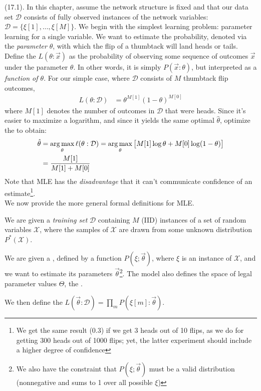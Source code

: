 \documentclass[11pt]{article}
\begin{document}
\p {} (17.1). In this chapter, assume the network structure is fixed and that our data set $\mathcal D$ consists of fully observed instances of the network variables: $\mathcal D = \{ \xi[1], \ldots, \xi[M] \}$. We begin with the simplest learning problem: parameter learning for a single variable. We want to estimate the probability, denoted via the \textit{parameter} $\theta$, with which the flip of a thumbtack will land heads or tails. Define the  $L(\theta : \vec{x})$ as the probability of observing some sequence of outcomes $\vec{x}$ under the parameter $\theta$. In other words, it is simply $P(\vec x : \theta)$, but interpreted as a \textit{function of $\theta$}. For our simple case, where $\mathcal D$ consists of $M$ thumbtack flip outcomes,
\begin{align}
	L(\theta : \mathcal D) &= \theta^{M[1]} (1 - \theta)^{M[0]}
\end{align}
where $M[1]$ denotes the number of outcomes in $\mathcal D$ that were heads. Since it's easier to maximize a logarithm, and since it yields the same optimal $\hat \theta$, optimize the  to obtain:
\begin{align}
	\hat \theta &= \operatorname*{arg\,max}_{\theta} \ell (\theta : \mathcal D) = \operatorname*{arg\,max}_{\theta} \big[ M[1] \log\theta + M[0]\log(1 - \theta) \big] \\
	&= \frac{ M[1] }{ M[1] + M[0] }
\end{align}
Note that MLE has the \textit{disadvantage} that it can't communicate confidence of an estimate\footnote{We get the same result (0.3) if we get 3 heads out of 10 flips, as we do for getting 300 heads out of 1000 flips; yet, the latter experiment should include a higher degree of confidence}. \\

We now provide the more general formal definitions for MLE. 
\begin{compactitem}
	\item We are given a \textit{training set} $\mathcal D$ containing $M$ (IID) instances of a set of random variables $\mathcal X$, where the samples of $\mathcal X$ are drawn from some unknown distribution $P^*(\mathcal X)$. 
	
	\item We are given a , defined by a function $P(\xi ; \vec{\theta})$, where $\xi$ is an instance of $\mathcal X$, and we want to estimate its parameters $\vec{\theta}$\footnote{We also have the constraint that $P(\xi ; \vec{\theta})$ must be a valid distribution (nonnegative and sums to 1 over all possible $\xi$)}. The model also defines the space of legal parameter values $\Theta$, the . 
	
	\item We then define the  $L(\vec{\theta} : \mathcal D) = \prod_m P(\xi[m] : \vec{\theta})$. 
\end{compactitem}
\end{document}

